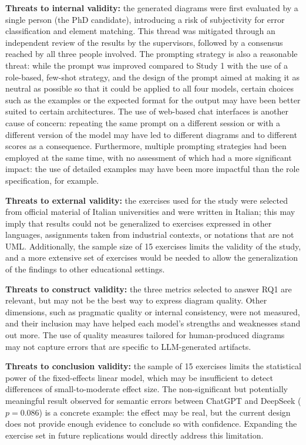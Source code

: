 \textbf{Threats to internal validity:} the generated diagrams were first evaluated by a single person (the PhD candidate), introducing a risk of subjectivity for error classification and element matching. This thread was mitigated through an independent review of the results by the supervisors, followed by a consensus reached by all three people involved. The prompting strategy is also a reasonable threat: while the prompt was improved compared to Study 1 with the use of a role-based, few-shot strategy, and the design of the prompt aimed at making it as neutral as possible so that it could be applied to all four models, certain choices such as the examples or the expected format for the output may have been better suited to certain architectures. The use of web-based chat interfaces is another cause of concern: repeating the same prompt on a different session or with a different version of the model may have led to different diagrams and to different scores as a consequence. Furthermore, multiple prompting strategies had been employed at the same time, with no assessment of which had a more significant impact: the use of detailed examples may have been more impactful than the role specification, for example.

\textbf{Threats to external validity:} the exercises used for the study were selected from official material of Italian universities and were written in Italian; this may imply that results could not be generalized to exercises expressed in other languages, assignments taken from industrial contexts, or notations that are not UML. Additionally, the sample size of 15 exercises limits the validity of the study, and a more extensive set of exercises would be needed to allow the generalization of the findings to other educational settings.

\textbf{Threats to construct validity:} the three metrics selected to answer RQ1 are relevant, but may not be the best way to express diagram quality. Other dimensions, such as pragmatic quality or internal consistency, were not measured, and their inclusion may have helped each model's strengths and weaknesses stand out more. The use of quality measures tailored for human-produced diagrams may not capture errors that are specific to LLM-generated artifacts.

\textbf{Threats to conclusion validity:} the sample of 15 exercises limits the statistical power of the fixed-effects linear model, which may be insufficient to detect differences of small-to-moderate effect size. The non-significant but potentially meaningful result observed for semantic errors between ChatGPT and DeepSeek ($p = 0.086$) is a concrete example: the effect may be real, but the current design does not provide enough evidence to conclude so with confidence. Expanding the exercise set in future replications would directly address this limitation.


